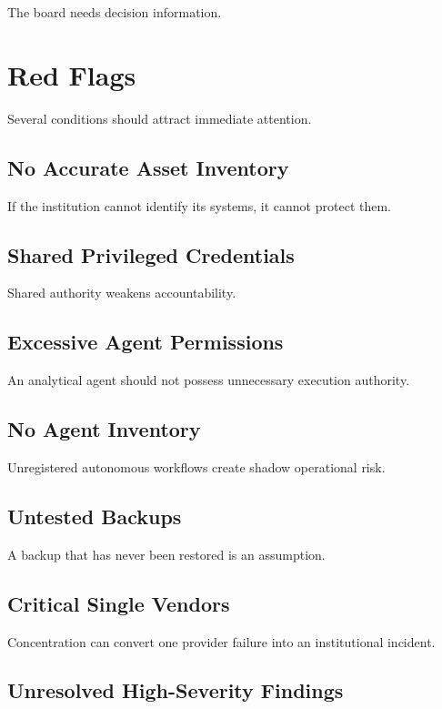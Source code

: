 The board needs decision information.

\section{Red Flags}

Several conditions should attract immediate attention.

\subsection{No Accurate Asset Inventory}

If the institution cannot identify its systems, it cannot protect them.

\subsection{Shared Privileged Credentials}

Shared authority weakens accountability.

\subsection{Excessive Agent Permissions}

An analytical agent should not possess unnecessary execution authority.

\subsection{No Agent Inventory}

Unregistered autonomous workflows create shadow operational risk.

\subsection{Untested Backups}

A backup that has never been restored is an assumption.

\subsection{Critical Single Vendors}

Concentration can convert one provider failure into an institutional incident.

\subsection{Unresolved High-Severity Findings}

